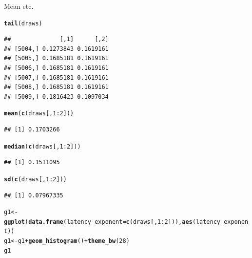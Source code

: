 \documentclass{article}\usepackage[]{graphicx}\usepackage[]{color}
\makeatletter
\newcommand{\hlnum}[1]{\textcolor[rgb]{0.686,0.059,0.569}{#1}}%
\newcommand{\hlopt}[1]{\textcolor[rgb]{0,0,0}{#1}}%
\newcommand{\hlstd}[1]{\textcolor[rgb]{0.345,0.345,0.345}{#1}}%
\newcommand{\hlkwb}[1]{\textcolor[rgb]{0.69,0.353,0.396}{#1}}%
\newcommand{\hlkwc}[1]{\textcolor[rgb]{0.333,0.667,0.333}{#1}}%
\newcommand{\hlkwd}[1]{\textcolor[rgb]{0.737,0.353,0.396}{\textbf{#1}}}%
\newenvironment{kframe}{%
 \def\at@end@of@kframe{}%
 \ifinner\ifhmode%
  \def\at@end@of@kframe{\end{minipage}}%
  \begin{minipage}{\columnwidth}%
 \fi\fi%
 \def\FrameCommand##1{\hskip\@totalleftmargin \hskip-\fboxsep
 \colorbox{shadecolor}{##1}\hskip-\fboxsep
     \hskip-\linewidth \hskip-\@totalleftmargin \hskip\columnwidth}%
 \MakeFramed {\advance\hsize-\width
   \@totalleftmargin\z@ \linewidth\hsize
   \@setminipage}}%
 {\par\unskip\endMakeFramed%
 \at@end@of@kframe}
\newenvironment{knitrout}{}{} %
\makeatother
\begin{document}
Mean etc.

\begin{knitrout}
\color{fgcolor}\begin{kframe}
\begin{alltt}
\hlkwd{tail}\hlstd{(draws)}
\end{alltt}
\begin{verbatim}
##              [,1]      [,2]
## [5004,] 0.1273843 0.1619161
## [5005,] 0.1685181 0.1619161
## [5006,] 0.1685181 0.1619161
## [5007,] 0.1685181 0.1619161
## [5008,] 0.1685181 0.1619161
## [5009,] 0.1816423 0.1097034
\end{verbatim}
\begin{alltt}
\hlkwd{mean}\hlstd{(}\hlkwd{c}\hlstd{(draws[,} \hlnum{1}\hlopt{:}\hlnum{2}\hlstd{]))}
\end{alltt}
\begin{verbatim}
## [1] 0.1703266
\end{verbatim}
\begin{alltt}
\hlkwd{median}\hlstd{(}\hlkwd{c}\hlstd{(draws[,} \hlnum{1}\hlopt{:}\hlnum{2}\hlstd{]))}
\end{alltt}
\begin{verbatim}
## [1] 0.1511095
\end{verbatim}
\begin{alltt}
\hlkwd{sd}\hlstd{(}\hlkwd{c}\hlstd{(draws[,} \hlnum{1}\hlopt{:}\hlnum{2}\hlstd{]))}
\end{alltt}
\begin{verbatim}
## [1] 0.07967335
\end{verbatim}
\begin{alltt}
\hlstd{g1} \hlkwb{<-} \hlkwd{ggplot}\hlstd{(}\hlkwd{data.frame}\hlstd{(}\hlkwc{latency_exponent} \hlstd{=} \hlkwd{c}\hlstd{(draws[,} \hlnum{1}\hlopt{:}\hlnum{2}\hlstd{])),} \hlkwd{aes}\hlstd{(latency_exponent))}
\hlstd{g1} \hlkwb{<-} \hlstd{g1} \hlopt{+} \hlkwd{geom_histogram}\hlstd{()} \hlopt{+} \hlkwd{theme_bw}\hlstd{(}\hlnum{28}\hlstd{)}
\hlstd{g1}
\end{alltt}



\end{kframe}
\end{knitrout}
\end{document}
